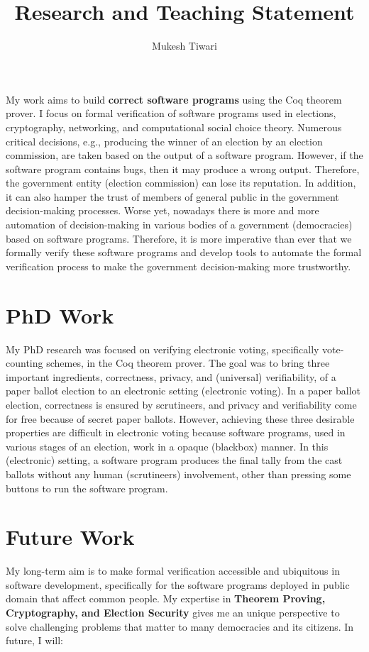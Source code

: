\documentclass[a4paper]{article}
\title{Research and Teaching Statement}
\author{Mukesh Tiwari}
\date{}
\begin{document}
\fontsize{12}{15}
\selectfont
\maketitle


My work aims to build \textbf{correct software programs} 
using the Coq theorem prover. 
I focus on formal verification of software programs used in elections, cryptography, 
networking, and computational social choice theory. Numerous critical decisions, e.g., 
producing the winner of an election by an election commission,
are taken based on the output of a software program. However, if the
software program contains bugs, then it may produce a wrong 
output. Therefore, the government entity (election commission) can 
lose its reputation. In addition, it can also hamper the trust of  
members of general public in the government decision-making processes.
Worse yet, nowadays there is more and more automation of decision-making 
in various bodies of a government (democracies) based on software programs.
Therefore, it is more imperative than ever  that  we formally verify these software programs and 
develop tools to automate the formal verification process to make the 
government decision-making more trustworthy. 

\section{PhD Work}
My PhD research was focused on verifying electronic voting, specifically vote-counting schemes, in 
the Coq theorem prover. The goal was to 
bring  three important ingredients, correctness, privacy, and (universal) verifiability, of a paper ballot election to 
an electronic setting (electronic voting). In a paper ballot election, correctness is
ensured by scrutineers, and privacy and verifiability  
come for free because of secret paper ballots.  However, achieving these three desirable properties 
are difficult in 
electronic voting because software programs, used in 
various stages of an election, work in a opaque (blackbox) manner. In this (electronic) setting, 
a software program produces the final tally from the cast ballots without any human (scrutineers) involvement, 
other than pressing some 
buttons to run the software program. 

\section{Future Work}
My long-term aim is to make formal verification accessible and ubiquitous in 
software development, specifically for the software programs deployed in public domain
that affect common people.
My expertise in \textbf{Theorem Proving, Cryptography, and Election Security}
gives me an unique perspective to solve challenging problems that matter to many democracies 
and its citizens. In future, I will:
\end{document}
